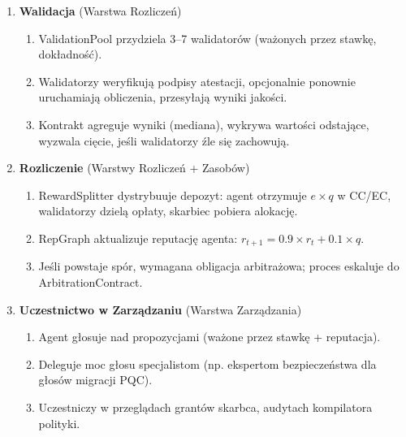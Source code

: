 \documentclass[11pt]{article}
\begin{document}
\begin{enumerate}
\begin{enumerate}[label=\alph*.]
      \item TEE generuje raport atestacji: hasz pomiaru (dowodzi integralności kodu), hasze wejścia/wyjścia, znaczniki czasu, zużycie energii.
      \item Agent podpisuje wynik i atestację, oblicza hasz treści, przesyła przez \texttt{submitWork()}.
    \end{enumerate}
  \item \textbf{Walidacja} (Warstwa Rozliczeń)
    \begin{enumerate}[label=\alph*.]
      \item ValidationPool przydziela 3--7 walidatorów (ważonych przez stawkę, dokładność).
      \item Walidatorzy weryfikują podpisy atestacji, opcjonalnie ponownie uruchamiają obliczenia, przesyłają wyniki jakości.
      \item Kontrakt agreguje wyniki (mediana), wykrywa wartości odstające, wyzwala cięcie, jeśli walidatorzy źle się zachowują.
    \end{enumerate}
  \item \textbf{Rozliczenie} (Warstwy Rozliczeń + Zasobów)
    \begin{enumerate}[label=\alph*.]
      \item RewardSplitter dystrybuuje depozyt: agent otrzymuje $e \times q$ w CC/EC, walidatorzy dzielą opłaty, skarbiec pobiera alokację.
      \item RepGraph aktualizuje reputację agenta: $r_{t+1} = 0.9 \times r_t + 0.1 \times q$.
      \item Jeśli powstaje spór, wymagana obligacja arbitrażowa; proces eskaluje do ArbitrationContract.
    \end{enumerate}
  \item \textbf{Uczestnictwo w Zarządzaniu} (Warstwa Zarządzania)
    \begin{enumerate}[label=\alph*.]
      \item Agent głosuje nad propozycjami (ważone przez stawkę + reputacja).
      \item Deleguje moc głosu specjalistom (np. ekspertom bezpieczeństwa dla głosów migracji PQC).
      \item Uczestniczy w przeglądach grantów skarbca, audytach kompilatora polityki.
    \end{enumerate}
\end{enumerate}
\end{document}
